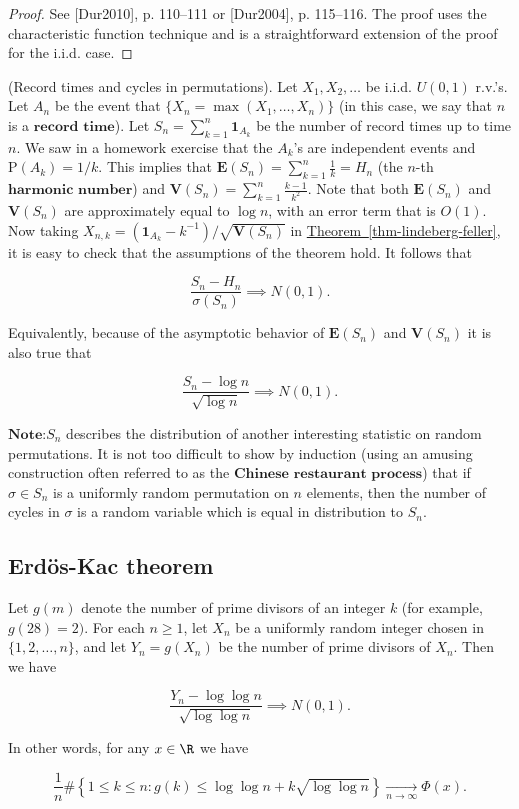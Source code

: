 \begin{proof}
See [Dur2010], p. 110--111 or [Dur2004], p. 115--116.
The proof uses the characteristic function technique
and is a straightforward extension of the proof for
the i.i.d. case.
\end{proof}

\begin{example}
(Record times and cycles in permutations). Let
$X_1, X_2, \ldots$ be i.i.d. $U(0,1)$ r.v.'s. Let
$A_n$ be the event that
$\{X_n = \max(X_1,\ldots,X_n)\}$ (in this case, we
say that $n$ is a $\textbf{record time}$). Let
$S_n = \sum_{k=1}^n \mathbf{1}_{A_k}$ be the number
of record times up to time $n$. We saw in a homework
exercise that the $A_k$'s are independent events and
$\mathrm{P}(A_k) = 1/k$. This implies that
$\mathbf{E}(S_n) = \sum_{k=1}^n \frac{1}{k} = H_n$
(the $n$-th $\textbf{harmonic number}$) and
$\mathbf{V}(S_n) = \sum_{k=1}^n \frac{k-1}{k^2}$.
Note that both $\mathbf{E}(S_n)$ and $\mathbf{V}(S_n)$
are approximately equal to $\log n$, with an error
term that is $O(1)$. Now taking
$X_{n,k} =
(\mathbf{1}_{A_k}-k^{-1})/\sqrt{\mathbf{V}(S_n)}$
in \hyperref[thm-lindeberg-feller]{Theorem~\ref*{thm-lindeberg-feller}}, it is easy to check
that the assumptions of the theorem hold. It follows
that

\[
\frac{S_n-H_n}{\sigma(S_n)} \implies N(0,1).
\]

\noindent Equivalently, because of the asymptotic behavior of
$\mathbf{E}(S_n)$ and $\mathbf{V}(S_n)$ it is also
true that

\[
\frac{S_n-\log n}{\sqrt{\log n}} \implies N(0,1).
\]

\noindent $\textbf{Note:}$$S_n$ describes the distribution of
another interesting statistic on random permutations.
It is not too difficult to show by induction (using an
amusing construction often referred to as the
$\textbf{Chinese restaurant process}$) that if
$\sigma \in S_n$ is a uniformly random permutation on
$n$ elements, then the number of cycles in $\sigma$
is a random variable which is equal in distribution to
$S_n$.
\end{example}

\subsection{Erdös-Kac theorem}

\begin{thm}
Let $g(m)$ denote the number of prime divisors of an
integer $k$ (for example, $g(28)=2)$. For each
$n\ge 1$, let $X_n$ be a uniformly random integer
chosen in $\{1,2,\ldots,n\}$, and let $Y_n=g(X_n)$ be
the number of prime divisors of $X_n$. Then we have

\[
\frac{Y_n - \log\log n}{\sqrt{\log\log n}} \implies N(0,1).
\]

\noindent In other words, for any $x\in\R$ we have

\[
\frac{1}{n}\# \left\{ 1\le k\le n: g(k) \le \log\log n + k \sqrt{\log\log n} \right\} \xrightarrow[n\to\infty]{} \Phi(x).
\]

\end{thm}

